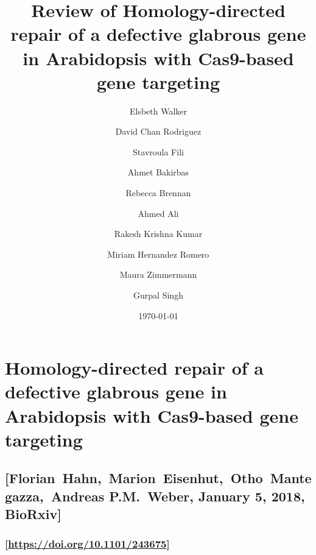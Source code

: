 \documentclass[10pt]{article}
\begin{document}
\title{Review of Homology-directed repair of a defective glabrous gene in
Arabidopsis with Cas9-based gene targeting}



\author[1]{Elsbeth Walker}%
\author[1]{David Chan Rodriguez}%
\author[1]{Stavroula Fili}%
\author[1]{Ahmet Bakirbas}%
\author[1]{Rebecca Brennan}%
\author[1]{Ahmed Ali}%
\author[1]{Rakesh Krishna Kumar}%
\author[1]{Miriam Hernandez Romero}%
\author[1]{Maura Zimmermann}%
\author[1]{Gurpal Singh}%
%


\vspace{-1em}



  \date{\today}


\begingroup
\let\center\flushleft
\let\endcenter\endflushleft
\maketitle
\endgroup









\section*{Homology-directed repair of a defective glabrous gene in
Arabidopsis with Cas9-based gene targeting
~}

{\label{463319}}

\subsection*{\texorpdfstring{{[}\textbf{Florian~Hahn,~Marion~Eisenhut,~Otho~Mantegazza,~Andreas
P.M.~Weber, January 5, 2018,
BioRxiv}{]}}{{[}Florian~Hahn,~Marion~Eisenhut,~Otho~Mantegazza,~Andreas P.M.~Weber, January 5, 2018, BioRxiv{]}}}

{\label{720048}}

\subsubsection*{\texorpdfstring{{[}\url{https://doi.org/10.1101/243675}{]}}{{[}https://doi.org/10.1101/243675{]}}}

{\label{236037}}

\section*{}
\end{document}
